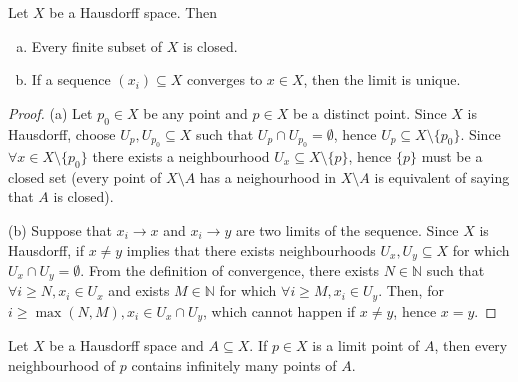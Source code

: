 \begin{proposition}
  \label{prop: Hausdorff properties}
  Let \(X\) be a Hausdorff space. Then
  \begin{enumerate}[(a)]
    \item Every finite subset of \(X\) is closed.
    \item If a sequence \((x_i) \subseteq X\) converges to \(x \in X\), then the
      limit is unique.
  \end{enumerate}
\end{proposition}

\begin{proof}
  (a) Let \(p_0 \in X\) be any point and \(p \in X\) be a distinct point. Since
  \(X\) is Hausdorff, choose \(U_p, U_{p_0} \subseteq X\) such that \(U_p \cap
  U_{p_0} = \emptyset\), hence  \(U_p \subseteq X \setminus \{p_0\}\). Since
  \(\forall x \in X \setminus \{p_0\}\) there exists a neighbourhood \(U_x
  \subseteq X \setminus \{p\}\), hence \(\{p\}\) must be a closed set (every
  point of \(X \setminus A\) has a neighourhood in \(X \setminus A\) is
  equivalent of saying that \(A\) is closed).

  (b) Suppose that \(x_i \to x\) and \(x_i \to y\) are two limits of the
  sequence. Since \(X\) is Hausdorff, if \(x \neq y\) implies that there exists
  neighbourhoods \(U_x, U_y \subseteq X\) for which \(U_x \cap U_y =
  \emptyset\). From the definition of convergence, there exists \(N \in
  \mathbb{N}\) such that \(\forall i \geq N, x_i \in U_x\) and exists \(M \in
  \mathbb{N}\) for which \(\forall i \geq M, x_i \in U_y\). Then, for \(i \geq
  \max(N, M), x_i \in U_x \cap U_y\), which cannot happen if \(x \neq y\), hence
  \(x = y\).
\end{proof}

\begin{proposition}
  Let \(X\) be a Hausdorff space and \(A \subseteq X\). If \(p \in X\) is a
  limit point of \(A\), then every neighbourhood of \(p\) contains infinitely
  many points of \(A\).
\end{proposition}

